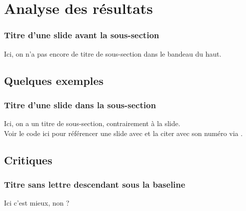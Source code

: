 \section[Analyse des résultats]{Analyse des résultats}

\begin{frame}
\frametitle{Titre d'une slide avant la sous-section}
Ici, on n’a pas encore de titre de sous-section dans le bandeau du haut.\\
\end{frame}

\subsection{Quelques exemples}

\begin{frame}
\frametitle{Titre d'une slide dans la sous-section}
Ici, on a un titre de sous-section, contrairement à la slide.\\[1.5cm]
Voir le code ici pour référencer une slide avec et la citer avec son numéro via .
\end{frame}

\subsection{Critiques}

\begin{frame}
\frametitle{Titre sans lettre descendant sous la baseline}
Ici c'est mieux, non ?
\end{frame}
